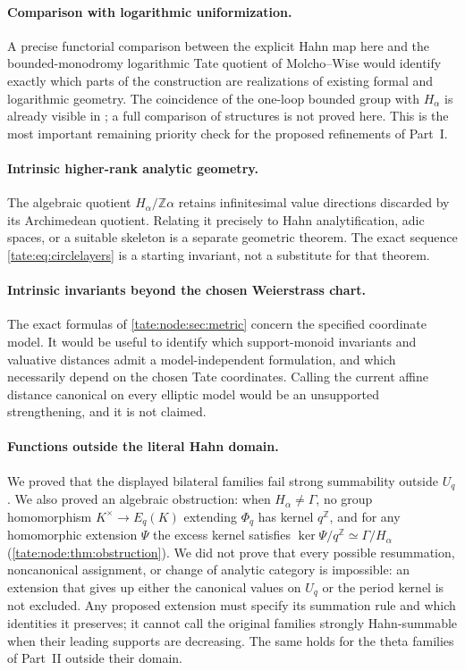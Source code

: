 \documentclass[11pt,letterpaper]{article}
\theoremstyle{definition}
\newcommand{\Z}{\mathbb Z}
\begin{document}
\paragraph{Comparison with logarithmic uniformization.}
A precise functorial comparison between the explicit Hahn map here and the
bounded-monodromy logarithmic Tate quotient of Molcho--Wise would identify
exactly which parts of the construction are realizations of existing formal
and logarithmic geometry. The coincidence of the one-loop bounded group
with $H_\alpha$ is already visible in \cite{MW}; a full comparison of
structures is not proved here. This is the most important remaining
priority check for the proposed refinements of Part~I.

\paragraph{Intrinsic higher-rank analytic geometry.}
The algebraic quotient $H_\alpha/\Z\alpha$ retains infinitesimal value
directions discarded by its Archimedean quotient. Relating it precisely
to Hahn analytification, adic spaces, or a suitable skeleton is a
separate geometric theorem. The exact sequence \eqref{tate:eq:circlelayers}
is a starting invariant, not a substitute for that theorem.

\paragraph{Intrinsic invariants beyond the chosen Weierstrass chart.}
The exact formulas of \cref{tate:node:sec:metric} concern the specified
coordinate model. It would be useful to identify which support-monoid
invariants and valuative distances admit a model-independent formulation,
and which necessarily depend on the chosen Tate coordinates. Calling the
current affine distance canonical on every elliptic model would be an
unsupported strengthening, and it is not claimed.

\paragraph{Functions outside the literal Hahn domain.}
We proved that the displayed bilateral families fail strong summability
outside $U_q$. We also proved an algebraic obstruction: when
$H_\alpha\ne\Gamma$, no group homomorphism $K^\times\to E_q(K)$ extending
$\Phi_q$ has kernel $q^\Z$, and for any homomorphic extension $\Psi$ the
excess kernel satisfies $\ker\Psi/q^\Z\simeq\Gamma/H_\alpha$
(\cref{tate:node:thm:obstruction}). We did not prove that every possible
resummation, noncanonical assignment, or change of analytic category is
impossible: an extension that gives up either the canonical values on $U_q$
or the period kernel is not excluded. Any proposed extension must specify
its summation rule and which identities it preserves; it cannot call the
original families strongly Hahn-summable when their leading supports are
decreasing. The same holds for the theta families of Part~II outside their
domain.
\end{document}
